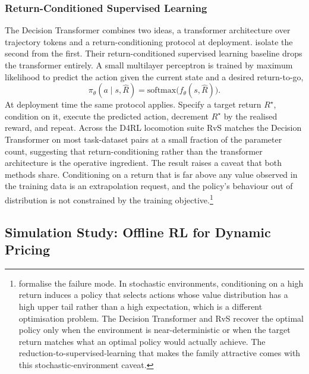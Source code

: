 \subsubsection{Return-Conditioned Supervised Learning}

The Decision Transformer combines two ideas, a transformer architecture over trajectory tokens and a return-conditioning protocol at deployment. \citet{Emmons2022} isolate the second from the first. Their return-conditioned supervised learning baseline drops the transformer entirely. A small multilayer perceptron is trained by maximum likelihood to predict the action given the current state and a desired return-to-go,
\begin{equation}
\pi_\theta(a \mid s, \widehat R) = \mathrm{softmax}\bigl(f_\theta(s, \widehat R)\bigr).
\label{eq:rvs}
\end{equation}
At deployment time the same protocol applies. Specify a target return $R^\star$, condition on it, execute the predicted action, decrement $R^\star$ by the realised reward, and repeat. Across the D4RL locomotion suite RvS matches the Decision Transformer on most task-dataset pairs at a small fraction of the parameter count, suggesting that return-conditioning rather than the transformer architecture is the operative ingredient. The result raises a caveat that both methods share. Conditioning on a return that is far above any value observed in the training data is an extrapolation request, and the policy's behaviour out of distribution is not constrained by the training objective.\footnote{\citet{Brandfonbrener2022} formalise the failure mode. In stochastic environments, conditioning on a high return induces a policy that selects actions whose value distribution has a high upper tail rather than a high expectation, which is a different optimisation problem. The Decision Transformer and RvS recover the optimal policy only when the environment is near-deterministic or when the target return matches what an optimal policy would actually achieve. The reduction-to-supervised-learning that makes the family attractive comes with this stochastic-environment caveat.}

\subsection{Simulation Study: Offline RL for Dynamic Pricing}
\label{sec:offline_sim}


